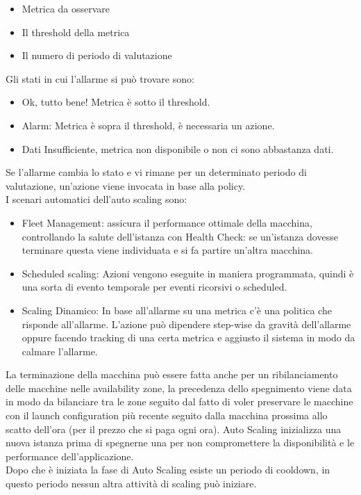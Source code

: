 \documentclass[11pt, twocolumn]{article}
\newenvironment{myitemize}
{ \begin{itemize}[topsep=0ex]
		\setlength{\itemsep}{0pt}
		\setlength{\parskip}{0pt}
		\setlength{\parsep}{0pt}     }
	{ \end{itemize}                  }
\begin{document}
\begin{myitemize}
	\item Metrica da osservare
	\item Il threshold della metrica
	\item Il numero di periodo di valutazione
\end{myitemize}
Gli stati in cui l'allarme si può trovare sono:
\begin{myitemize}
	\item Ok, tutto bene! Metrica è sotto il threshold.
	\item Alarm: Metrica è sopra il threshold, è necessaria un azione.
	\item Dati Insufficiente, metrica non disponibile o non ci sono abbastanza dati.
\end{myitemize}
Se l'allarme cambia lo stato e vi rimane per un determinato periodo di valutazione, un'azione viene invocata in base alla policy.\\
I scenari automatici dell'auto scaling sono:
\begin{myitemize}
	\item Fleet Management: assicura il performance ottimale della macchina, controllando la salute dell'istanza con Health Check: se un'istanza dovesse terminare questa viene individuata e si fa partire un'altra macchina.
	\item Scheduled scaling: Azioni vengono eseguite in maniera programmata, quindi è una sorta di evento temporale per eventi ricorsivi o scheduled.
	\item Scaling Dinamico: In base all'allarme su una metrica c'è una politica che risponde all'allarme. L'azione può dipendere step-wise da gravità dell'allarme oppure facendo tracking di una certa metrica e aggiusto il sistema in modo da calmare l'allarme.
\end{myitemize}
La terminazione della macchina può essere fatta anche per un ribilanciamento delle macchine nelle availability zone, la precedenza dello spegnimento viene data in modo da bilanciare tra le zone seguito dal fatto di voler preservare le macchine con il launch configuration più recente seguito dalla macchina prossima allo scatto dell'ora (per il prezzo che si paga ogni ora).
Auto Scaling inizializza una nuova istanza prima di spegnerne una per non compromettere la disponibilità e le performance dell'applicazione.\\
Dopo che è iniziata la fase di Auto Scaling esiste un periodo di cooldown, in questo periodo nessun altra attività di scaling può iniziare.\\
\end{document}
